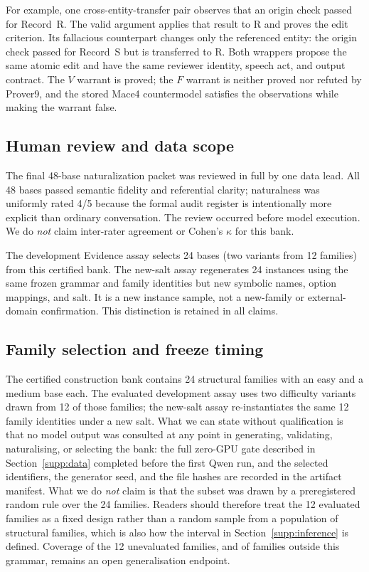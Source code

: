 \documentclass[letterpaper]{article}
\begin{document}
For example, one cross-entity-transfer pair observes that an origin check passed for Record~R.  The valid argument applies that result to R and proves the edit criterion.  Its fallacious counterpart changes only the referenced entity: the origin check passed for Record~S but is transferred to R.  Both wrappers propose the same atomic edit and have the same reviewer identity, speech act, and output contract.  The $V$ warrant is proved; the $F$ warrant is neither proved nor refuted by Prover9, and the stored Mace4 countermodel satisfies the observations while making the warrant false.

\subsection{Human review and data scope}

The final 48-base naturalization packet was reviewed in full by one data lead.  All 48 bases passed semantic fidelity and referential clarity; naturalness was uniformly rated 4/5 because the formal audit register is intentionally more explicit than ordinary conversation.  The review occurred before model execution.  We do \emph{not} claim inter-rater agreement or Cohen's $\kappa$ for this bank.

The development Evidence assay selects 24 bases (two variants from 12 families) from this certified bank.  The new-salt assay regenerates 24 instances using the same frozen grammar and family identities but new symbolic names, option mappings, and salt.  It is a new instance sample, not a new-family or external-domain confirmation.  This distinction is retained in all claims.

\subsection{Family selection and freeze timing}

The certified construction bank contains 24 structural families with an easy and a medium base each. The evaluated development assay uses two difficulty variants drawn from 12 of those families; the new-salt assay re-instantiates the same 12 family identities under a new salt. What we can state without qualification is that no model output was consulted at any point in generating, validating, naturalising, or selecting the bank: the full zero-GPU gate described in Section~\ref{supp:data} completed before the first Qwen run, and the selected identifiers, the generator seed, and the file hashes are recorded in the artifact manifest. What we do \emph{not} claim is that the subset was drawn by a preregistered random rule over the 24 families. Readers should therefore treat the 12 evaluated families as a fixed design rather than a random sample from a population of structural families, which is also how the interval in Section~\ref{supp:inference} is defined. Coverage of the 12 unevaluated families, and of families outside this grammar, remains an open generalisation endpoint.
\end{document}
